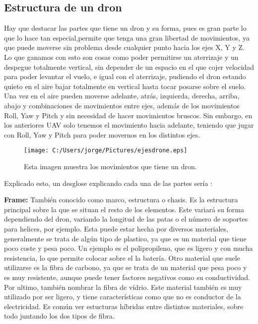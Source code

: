 \documentclass{article}
\begin{document}
\subsection{Estructura de un dron}
\hspace{1 cm} Hay que destacar las partes que tiene un dron y su forma, pues es gran parte lo que lo hace tan especial,permite que tenga una gran libertad de movimientos, ya que puede moverse sin problema desde cualquier punto hacia los ejes X, Y y Z. Lo que ganamos con esto son cosas como poder permitirse un aterrizaje y un despegue totalmente vertical, sin depender de un espacio en el que cojer velocidad para poder levantar el vuelo, e igual con el aterrizaje, pudiendo el dron estando quieto en el aire bajar totalmente en vertical hasta tocar posarse sobre el suelo. Una vez en el aire pueden moverse adelante, atr\'as, izquierda, derecha, arriba, abajo y combinaciones de movimientos entre ejes, adem\'as de los movimientos Roll, Yaw y Pitch y sin necesidad de hacer movimientos bruscos. Sin embargo, en los anteriores UAV solo tenemos el movimiento hacia adelante, teniendo que jugar con Roll, Yaw y Pitch para poder movernos en los distintos ejes.

\begin{figure}[ht]
	\centering
		\texttt{[image: C:/Users/jorge/Pictures/ejesdrone.eps]}
		\caption{Esta imagen muestra los movimientos que tiene un dron.}
	\label{fig:ejesdrone}
\end{figure}

\hspace{1 cm} Explicado esto, un desglose explicando cada una de las partes ser\'ia :

\hspace{1 cm}\textbf{Frame:} Tambi\'en conocido como marco, estructura o chasis. Es la estructura principal sobre la que se situan el resto de los elementos. Este variar\'a su forma dependiendo del dron, variando la longitud de las patas o el n\'umero de soportes para helices, por ejemplo. Esta puede estar hecha por diversos materiales, generalmente se trata de alg\'un tipo de plastico, ya que es un material que tiene poco coste y pesa poco. Un ejemplo es el polipropileno, que es ligero y con mucha resistencia, lo que permite colocar sobre el la bater\'ia. Otro material que suele utilizarse es la fibra de carbono, ya que se trata de un material que pesa poco y es muy resistente, aunque puede tener factores negativos como su conductividad. Por ultimo, tambi\'en nombrar la fibra de v\'idrio. Este material tambi\'en es muy utilizado por ser ligero, y tiene caracter\'isticas como que no es conductor de la electricidad. Es com\'un ver estucturas h\'ibridas entre distintos materiales, sobre todo juntando los dos tipos de fibra. 
\end{document}
